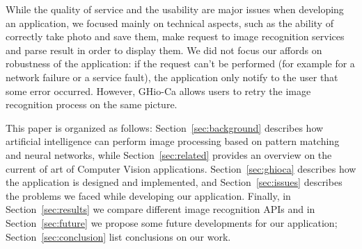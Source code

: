 While the quality of service and the usability are major issues when developing an application, we focused mainly on technical aspects, such as the ability of correctly take photo and save them, make request to image recognition services and parse result in order to display them. We did not focus our affords on robustness of the application: if the request can't be performed (for example for a network failure or a service fault), the application only notify to the user that some error occurred. However, GHio-Ca allows users to retry the image recognition process on the same picture.

This paper is organized as follows: Section~\ref{sec:background} describes how artificial intelligence can perform image processing based on pattern matching and neural networks, while Section~\ref{sec:related} provides an overview on the current of art of Computer Vision applications. Section~\ref{sec:ghioca} describes how the application is designed and implemented, and Section~\ref{sec:issues} describes the problems we faced while developing our application. Finally, in Section~\ref{sec:results} we compare different image recognition APIs and in Section~\ref{sec:future} we propose some future developments for our application; Section~\ref{sec:conclusion} list conclusions on our work.